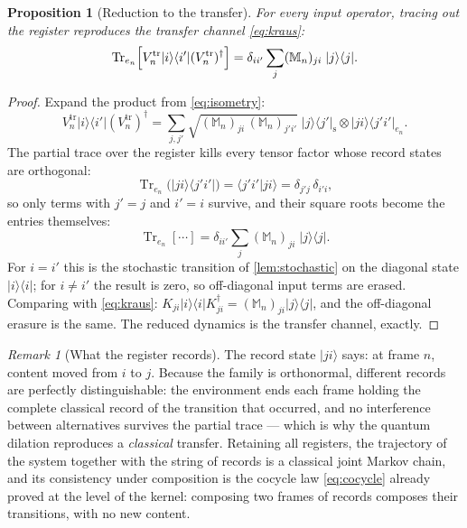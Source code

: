 \documentclass[11pt]{amsbook}
\theoremstyle{plain}
\newtheorem{proposition}[theorem]{Proposition}
\theoremstyle{definition}
\theoremstyle{remark}
\newtheorem{remark}[theorem]{Remark}
\newcommand{\uses}[1]{\par\nopagebreak\noindent{\footnotesize\emph{Uses: #1.}\par}}
\begin{document}
\begin{proposition}[Reduction to the transfer]\label{prop:reduction}
For every input operator, tracing out the register reproduces the transfer channel \cref{eq:kraus}:
\begin{equation}\label{eq:reduction}
\operatorname{Tr}_{e_{n}}\Bigl[ V_{n}^{\mathrm{tr}} |i\rangle\langle i'| (V_{n}^{\mathrm{tr}})^{\dagger} \Bigr]
= \delta_{i i'} \sum_{j} (\mathbb{M}_{n})_{ji}\; |j\rangle\langle j|.
\end{equation}
\uses{\cref{eq:isometry}, \cref{lem:stochastic}}
\end{proposition}

\begin{proof}
Expand the product from \cref{eq:isometry}:
\begin{equation}\label{eq:dilation-expand}
V_{n}^{\mathrm{tr}} |i\rangle\langle i'| (V_{n}^{\mathrm{tr}})^{\dagger}
= \sum_{j, j'} \sqrt{(\mathbb{M}_{n})_{ji}\,(\mathbb{M}_{n})_{j'i'}}\; |j\rangle\langle j'|_{\mathrm s} \otimes |ji\rangle\langle j'i'|_{e_{n}}.
\end{equation}
The partial trace over the register kills every tensor factor whose record states are orthogonal:
\begin{equation}\label{eq:ptrace}
\operatorname{Tr}_{e_{n}}\bigl( |ji\rangle\langle j'i'| \bigr) = \langle j'i' | j i \rangle = \delta_{j' j}\,\delta_{i' i},
\end{equation}
so only terms with $j' = j$ and $i' = i$ survive, and their square roots become the entries themselves:
\begin{equation}\label{eq:collapse}
\operatorname{Tr}_{e_{n}}[\cdots] = \delta_{i i'} \sum_{j} (\mathbb{M}_{n})_{ji}\; |j\rangle\langle j|.
\end{equation}
For $i = i'$ this is the stochastic transition of \cref{lem:stochastic} on the diagonal state $|i\rangle\langle i|$; for $i \neq i'$ the result is zero, so off-diagonal input terms are erased. Comparing with \cref{eq:kraus}: $K_{ji}|i\rangle\langle i|K_{ji}^{\dagger} = (\mathbb{M}_{n})_{ji}|j\rangle\langle j|$, and the off-diagonal erasure is the same. The reduced dynamics is the transfer channel, exactly.
\end{proof}

\begin{remark}[What the register records]\label{rem:record}
The record state $|ji\rangle$ says: at frame $n$, content moved from $i$ to $j$. Because the family is orthonormal, different records are perfectly distinguishable: the environment ends each frame holding the complete classical record of the transition that occurred, and no interference between alternatives survives the partial trace --- which is why the quantum dilation reproduces a \emph{classical} transfer. Retaining all registers, the trajectory of the system together with the string of records is a classical joint Markov chain, and its consistency under composition is the cocycle law \cref{eq:cocycle} already proved at the level of the kernel: composing two frames of records composes their transitions, with no new content.
\end{remark}
\end{document}
